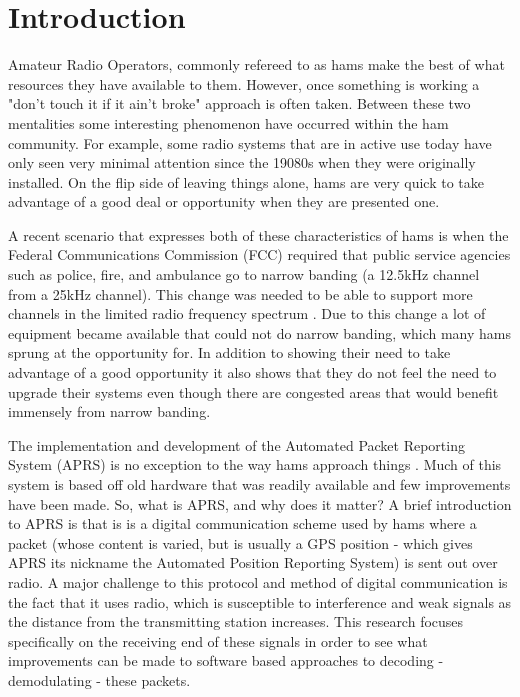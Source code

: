 \chapter{Introduction}

Amateur Radio Operators, commonly refereed to as hams make the best of what resources they have available to them. However, once something is working a "don't touch it if it ain't broke" approach is often taken. Between these two mentalities some interesting phenomenon have occurred within the ham community. For example, some radio systems that are in active use today have only seen very minimal attention since the 19080s when they were originally installed. On the flip side of leaving things alone, hams are very quick to take advantage of a good deal or opportunity when they are presented one.

A recent scenario that expresses both of these characteristics of hams is when the Federal Communications Commission (FCC) required that public service agencies such as police, fire, and ambulance go to narrow banding (a 12.5kHz channel from a 25kHz channel). This change was needed to be able to support more channels in the limited radio frequency spectrum \cite{Commission2012}. Due to this change a lot of equipment became available that could not do narrow banding, which many hams sprung at the opportunity for. In addition to showing their need to take advantage of a good opportunity it also shows that they do not feel the need to upgrade their systems even though there are congested areas that would benefit immensely from narrow banding.

The implementation and development of the Automated Packet Reporting System (APRS) is no exception to the way hams approach things \cite{Bruninga}. Much of this system is based off old hardware that was readily available and few improvements have been made. So, what is APRS, and why does it matter? A brief introduction to APRS is that is is a digital communication scheme used by hams where a packet (whose content is varied, but is usually a GPS position - which gives APRS its nickname the Automated Position Reporting System) is sent out over radio. A major challenge to this protocol and method of digital communication is the fact that it uses radio, which is susceptible to interference and weak signals as the distance from the transmitting station increases. This research focuses specifically on the receiving end of these signals in order to see what improvements can be made to software based approaches to decoding - demodulating - these packets.

